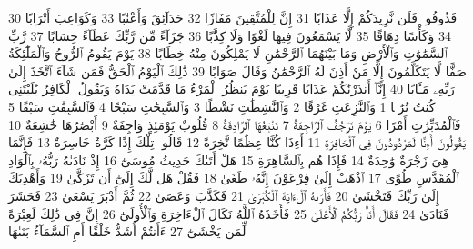 {\tiny\colorbox{cl_aya}{30}} فَذُوقُوا۟ فَلَن نَّزِيدَكُمْ إِلَّا عَذَابًا
{\tiny\colorbox{cl_aya}{31}} إِنَّ لِلْمُتَّقِينَ مَفَازًا
{\tiny\colorbox{cl_aya}{32}} حَدَآئِقَ وَأَعْنَٰبًا
{\tiny\colorbox{cl_aya}{33}} وَكَوَاعِبَ أَتْرَابًا
{\tiny\colorbox{cl_aya}{34}} وَكَأْسًا دِهَاقًا
{\tiny\colorbox{cl_aya}{35}} لَّا يَسْمَعُونَ فِيهَا لَغْوًا وَلَا كِذَّٰبًا
{\tiny\colorbox{cl_aya}{36}} جَزَآءً مِّن رَّبِّكَ عَطَآءً حِسَابًا
{\tiny\colorbox{cl_aya}{37}} رَّبِّ ٱلسَّمَٰوَٰتِ وَٱلْأَرْضِ وَمَا بَيْنَهُمَا ٱلرَّحْمَٰنِ لَا يَمْلِكُونَ مِنْهُ خِطَابًا
{\tiny\colorbox{cl_aya}{38}} يَوْمَ يَقُومُ ٱلرُّوحُ وَٱلْمَلَٰٓئِكَةُ صَفًّا لَّا يَتَكَلَّمُونَ إِلَّا مَنْ أَذِنَ لَهُ ٱلرَّحْمَٰنُ وَقَالَ صَوَابًا
{\tiny\colorbox{cl_aya}{39}} ذَٰلِكَ ٱلْيَوْمُ ٱلْحَقُّ فَمَن شَآءَ ٱتَّخَذَ إِلَىٰ رَبِّهِۦ مَـَٔابًا
{\tiny\colorbox{cl_aya}{40}} إِنَّآ أَنذَرْنَٰكُمْ عَذَابًا قَرِيبًا يَوْمَ يَنظُرُ ٱلْمَرْءُ مَا قَدَّمَتْ يَدَاهُ وَيَقُولُ ٱلْكَافِرُ يَٰلَيْتَنِى كُنتُ تُرَٰبًۢا
{\tiny\colorbox{cl_aya}{1}} وَٱلنَّٰزِعَٰتِ غَرْقًا
{\tiny\colorbox{cl_aya}{2}} وَٱلنَّٰشِطَٰتِ نَشْطًا
{\tiny\colorbox{cl_aya}{3}} وَٱلسَّٰبِحَٰتِ سَبْحًا
{\tiny\colorbox{cl_aya}{4}} فَٱلسَّٰبِقَٰتِ سَبْقًا
{\tiny\colorbox{cl_aya}{5}} فَٱلْمُدَبِّرَٰتِ أَمْرًا
{\tiny\colorbox{cl_aya}{6}} يَوْمَ تَرْجُفُ ٱلرَّاجِفَةُ
{\tiny\colorbox{cl_aya}{7}} تَتْبَعُهَا ٱلرَّادِفَةُ
{\tiny\colorbox{cl_aya}{8}} قُلُوبٌ يَوْمَئِذٍ وَاجِفَةٌ
{\tiny\colorbox{cl_aya}{9}} أَبْصَٰرُهَا خَٰشِعَةٌ
{\tiny\colorbox{cl_aya}{10}} يَقُولُونَ أَءِنَّا لَمَرْدُودُونَ فِى ٱلْحَافِرَةِ
{\tiny\colorbox{cl_aya}{11}} أَءِذَا كُنَّا عِظَٰمًا نَّخِرَةً
{\tiny\colorbox{cl_aya}{12}} قَالُوا۟ تِلْكَ إِذًا كَرَّةٌ خَاسِرَةٌ
{\tiny\colorbox{cl_aya}{13}} فَإِنَّمَا هِىَ زَجْرَةٌ وَٰحِدَةٌ
{\tiny\colorbox{cl_aya}{14}} فَإِذَا هُم بِٱلسَّاهِرَةِ
{\tiny\colorbox{cl_aya}{15}} هَلْ أَتَىٰكَ حَدِيثُ مُوسَىٰٓ
{\tiny\colorbox{cl_aya}{16}} إِذْ نَادَىٰهُ رَبُّهُۥ بِٱلْوَادِ ٱلْمُقَدَّسِ طُوًى
{\tiny\colorbox{cl_aya}{17}} ٱذْهَبْ إِلَىٰ فِرْعَوْنَ إِنَّهُۥ طَغَىٰ
{\tiny\colorbox{cl_aya}{18}} فَقُلْ هَل لَّكَ إِلَىٰٓ أَن تَزَكَّىٰ
{\tiny\colorbox{cl_aya}{19}} وَأَهْدِيَكَ إِلَىٰ رَبِّكَ فَتَخْشَىٰ
{\tiny\colorbox{cl_aya}{20}} فَأَرَىٰهُ ٱلْءَايَةَ ٱلْكُبْرَىٰ
{\tiny\colorbox{cl_aya}{21}} فَكَذَّبَ وَعَصَىٰ
{\tiny\colorbox{cl_aya}{22}} ثُمَّ أَدْبَرَ يَسْعَىٰ
{\tiny\colorbox{cl_aya}{23}} فَحَشَرَ فَنَادَىٰ
{\tiny\colorbox{cl_aya}{24}} فَقَالَ أَنَا۠ رَبُّكُمُ ٱلْأَعْلَىٰ
{\tiny\colorbox{cl_aya}{25}} فَأَخَذَهُ ٱللَّهُ نَكَالَ ٱلْءَاخِرَةِ وَٱلْأُولَىٰٓ
{\tiny\colorbox{cl_aya}{26}} إِنَّ فِى ذَٰلِكَ لَعِبْرَةً لِّمَن يَخْشَىٰٓ
{\tiny\colorbox{cl_aya}{27}} ءَأَنتُمْ أَشَدُّ خَلْقًا أَمِ ٱلسَّمَآءُ بَنَىٰهَا
